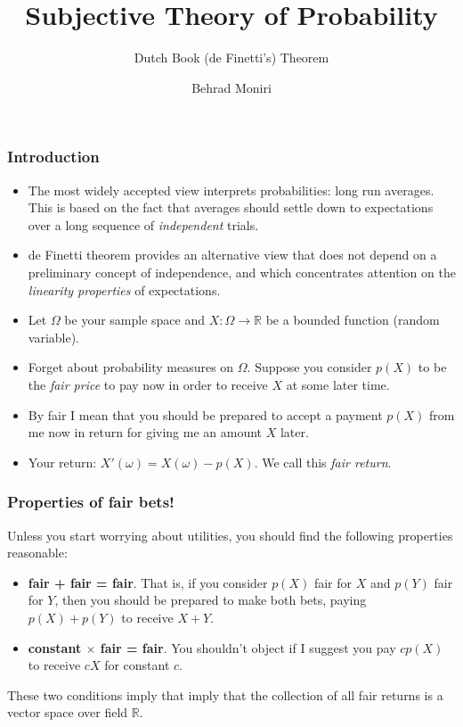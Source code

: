 \documentclass{beamer}
\title[de Finetti Theorem]{Subjective Theory of Probability}
\subtitle{Dutch Book (de Finetti's) Theorem}
\author[Behrad Moniri]{Behrad Moniri}
\institute[]
{

La soci\'{e}t\'{e} secr\'{e}te des statisticiens\\ et des ing\'{e}nieurs \'{e}lectriciens au ch\^{o}mage\\\vspace{0.5cm}
\texttt{bemoniri@live.com}
}
\date{}
\begin{document}
\maketitle

\begin{frame}
\frametitle{Introduction}
\begin{itemize}

\item The most widely accepted view interprets probabilities:
long run averages. This is based on the fact that averages should settle down to expectations over a long sequence of \textit{independent} trials.


\pause
\item de Finetti theorem provides an alternative view that does not depend on a preliminary concept of independence, and which concentrates attention on the \textit{linearity properties} of expectations.

\end{itemize}
\end{frame}

\begin{frame}
\begin{itemize}
\item
Let $\Omega$ be your sample space and $X: \Omega \to \mathbb{R}$ be a bounded function (random variable). 
\pause
\item
Forget about probability measures on $\Omega$. Suppose you consider $p(X)$ to be the \textit{fair price}  to pay now in order to receive $X$ at some later time.
\pause
\item By fair I mean that you should be prepared to accept a payment $p(X)$ from me now in return for giving me an amount $X$ later.
\pause
\item Your return: $X'(\omega) = X(\omega) - p(X)$. We call this \textit{fair return}.
\end{itemize}
\end{frame}


\begin{frame}
\frametitle{Properties of fair bets!}

Unless you start worrying about utilities, you should find the following properties reasonable:
\pause
\begin{itemize}
	\item
	\textbf{fair + fair = fair}. That is, if you consider $p(X)$ fair for $X$ and $p(Y)$ fair for $Y$, then you should be prepared to make both bets, paying $p(X) + p(Y)$ to receive $X + Y$.
	\pause
	\item
	\textbf{constant $\times$ fair = fair}. You shouldn't object if I suggest you pay $cp(X)$ to receive $cX$ for constant $c$.

\end{itemize}

\pause

These two conditions imply that imply that the collection of all fair returns is a vector space over field $\mathbb{R}$.
\end{frame}
\end{document}
